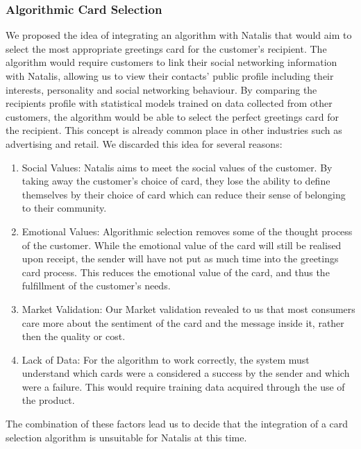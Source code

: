 \documentclass[10pt, a4paper]{article}
\begin{document}
\subsubsection*{Algorithmic Card Selection}
We proposed the idea of integrating an algorithm with Natalis that would aim to select the most appropriate greetings card for the customer’s recipient. The algorithm would require customers to link their social networking information with Natalis, allowing us to view their contacts' public profile including their interests, personality and social networking behaviour. By comparing the recipients profile with statistical models trained on data collected from other customers, the algorithm would be able to select the perfect greetings card for the recipient. This concept is already common place in other industries such as advertising and retail.
We discarded this idea for several reasons:
\begin{enumerate}
  \item Social Values: Natalis aims to meet the social values of the customer. By taking away the customer’s choice of card, they lose the ability to define themselves by their choice of card which can reduce their sense of belonging to their community.
  \item Emotional Values: Algorithmic selection removes some of the thought process of the customer. While the emotional value of the card will still be realised upon receipt, the sender will have not put as much time into the greetings card process. This reduces the emotional value of the card, and thus the fulfillment of the customer's needs.
  \item Market Validation: Our Market validation revealed to us that most consumers care more about the sentiment of the card and the message inside it, rather then the quality or cost.
  \item Lack of Data: For the algorithm to work correctly, the system must understand which cards were a considered a success by the sender and which were a failure. This would require training data acquired through the use of the product.
\end{enumerate}
The combination of these factors lead us to decide that the integration of a card selection algorithm is unsuitable for Natalis at this time.
\end{document}
